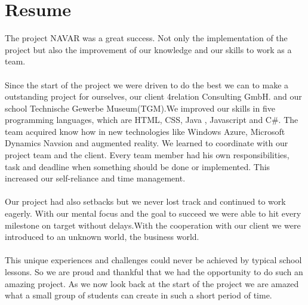 \chapter{Resume}\label{chapter:Resume}
The project NAVAR was a great success. Not only the implementation of the project but also the improvement of our knowledge and our skills to work as a team.
\\\\
Since the start of the project we were driven to do the best we can to make a outstanding project for ourselves, our client 4relation Consulting GmbH. and our school Technische Gewerbe Museum(TGM).We improved our skills in five programming languages, which are HTML, CSS, Java , Javascript and C\#. The team acquired know how in new technologies like Windows Azure, Microsoft Dynamics Navsion and augmented reality.   
We learned to coordinate with our project team and the client. Every team member had his own responsibilities, task and deadline when something should be done or implemented. This increased our self-reliance and time management.
\\\\
Our project had also setbacks but we never lost track and continued to work eagerly. With our mental focus and the goal to succeed we were able to hit every milestone on target without delays.With the cooperation with our client we were introduced to an unknown world, the business world. 
\\\\
This unique experiences and challenges could never be achieved by typical school lessons. So we are proud and thankful that we had the opportunity to do such an amazing project. As we now look back at the start of the project we are amazed what a small group of students can create in such a short period of time.                 
\clearpage